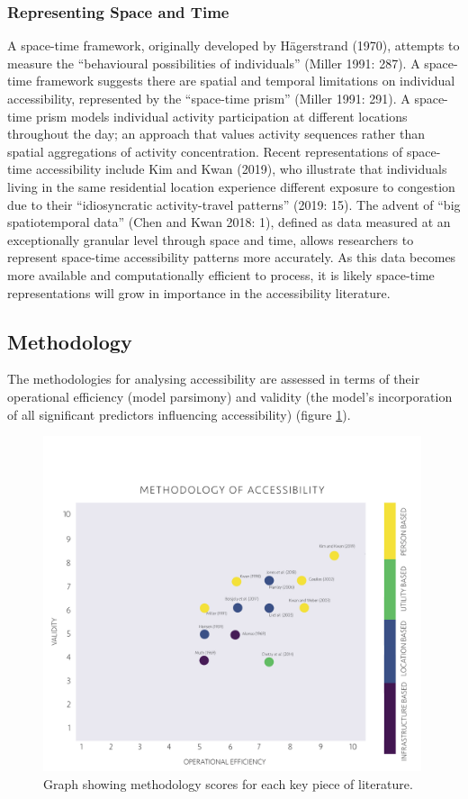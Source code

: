 \documentclass[a4paper,UKenglish]{lipics-v2018}
\begin{document}
\subsubsection{Representing Space and Time}
A space-time framework, originally developed by 
Hägerstrand (1970), attempts to measure the “behavioural possibilities of individuals” (Miller 1991: 287). A space-time framework suggests there are spatial and temporal limitations on individual accessibility, represented by the “space-time prism” (Miller 1991: 291). A space-time prism models individual activity participation at different locations throughout the day; an approach that values activity sequences rather than spatial aggregations of activity concentration. Recent representations of space-time accessibility include Kim and Kwan (2019), who illustrate that individuals living in the same residential location experience different exposure to congestion due to their “idiosyncratic activity-travel patterns” (2019: 15). The advent of “big spatiotemporal data” (Chen and Kwan 2018: 1), defined as data measured at an exceptionally granular level through space and time, allows researchers to represent space-time accessibility patterns more accurately. As this data becomes more available and computationally efficient to process, it is likely space-time representations will grow in importance in the accessibility literature.

\subsection{Methodology}
The methodologies for analysing accessibility are assessed in terms of their operational efficiency (model parsimony) and validity (the model’s incorporation of all significant predictors influencing accessibility) (figure \ref{fig:Methodologies}).

\begin{figure}[ht]
    \centering
    \includegraphics[width=0.99\textwidth]{Literature_review/Methodology.pdf}
    \caption[Methodology scatterplot]{Graph showing methodology scores for each key piece of literature.} 
    \label{fig:Methodologies}
\end{figure}
\end{document}
